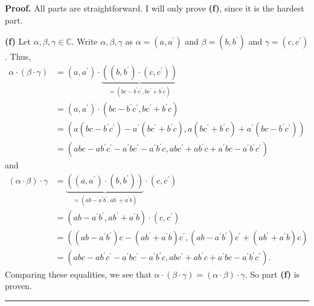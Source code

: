 \documentclass[numbers=enddot,12pt,final,onecolumn,notitlepage]{scrartcl}%
\numberwithin{exer}{subsection}
\theoremstyle{definition}
\newenvironment{proof}[1][Proof]{\noindent\textbf{#1.} }{\ \rule{0.5em}{0.5em}}
\begin{document}
\begin{proof}
All parts are straightforward. I will only prove \textbf{(f)}, since it is the
hardest part.

\textbf{(f)} Let $\alpha,\beta,\gamma\in\mathbb{C}$. Write $\alpha
,\beta,\gamma$ as $\alpha=\left(  a,a^{\prime}\right)  $ and $\beta=\left(
b,b^{\prime}\right)  $ and $\gamma=\left(  c,c^{\prime}\right)  $. Thus,%
\begin{align*}
\alpha\cdot\left(  \beta\cdot\gamma\right)   &  =\left(  a,a^{\prime}\right)
\cdot\underbrace{\left(  \left(  b,b^{\prime}\right)  \cdot\left(
c,c^{\prime}\right)  \right)  }_{=\left(  bc-b^{\prime}c^{\prime},bc^{\prime
}+b^{\prime}c\right)  }\\
&  =\left(  a,a^{\prime}\right)  \cdot\left(  bc-b^{\prime}c^{\prime
},bc^{\prime}+b^{\prime}c\right) \\
&  =\left(  a\left(  bc-b^{\prime}c^{\prime}\right)  -a^{\prime}\left(
bc^{\prime}+b^{\prime}c\right)  ,a\left(  bc^{\prime}+b^{\prime}c\right)
+a^{\prime}\left(  bc-b^{\prime}c^{\prime}\right)  \right) \\
&  =\left(  abc-ab^{\prime}c^{\prime}-a^{\prime}bc^{\prime}-a^{\prime
}b^{\prime}c,abc^{\prime}+ab^{\prime}c+a^{\prime}bc-a^{\prime}b^{\prime
}c^{\prime}\right)
\end{align*}
\newline and%
\begin{align*}
\left(  \alpha\cdot\beta\right)  \cdot\gamma &  =\underbrace{\left(  \left(
a,a^{\prime}\right)  \cdot\left(  b,b^{\prime}\right)  \right)  }_{=\left(
ab-a^{\prime}b^{\prime},ab^{\prime}+a^{\prime}b\right)  }\cdot\left(
c,c^{\prime}\right) \\
&  =\left(  ab-a^{\prime}b^{\prime},ab^{\prime}+a^{\prime}b\right)
\cdot\left(  c,c^{\prime}\right) \\
&  =\left(  \left(  ab-a^{\prime}b^{\prime}\right)  c-\left(  ab^{\prime
}+a^{\prime}b\right)  c^{\prime},\left(  ab-a^{\prime}b^{\prime}\right)
c^{\prime}+\left(  ab^{\prime}+a^{\prime}b\right)  c\right) \\
&  =\left(  abc-ab^{\prime}c^{\prime}-a^{\prime}bc^{\prime}-a^{\prime
}b^{\prime}c,abc^{\prime}+ab^{\prime}c+a^{\prime}bc-a^{\prime}b^{\prime
}c^{\prime}\right)  .
\end{align*}
Comparing these equalities, we see that $\alpha\cdot\left(  \beta\cdot
\gamma\right)  =\left(  \alpha\cdot\beta\right)  \cdot\gamma$. So part
\textbf{(f)} is proven.
\end{proof}
\end{document}
